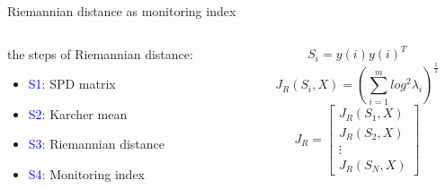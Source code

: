 \documentclass[10pt]{beamer}
\begin{document}
\begin{frame}{Riemannian distance as monitoring index}
   \begin{columns}
        \begin{column}{0.5\textwidth}
            the steps of Riemannian distance:
      \begin{itemize}
      \item \textcolor{blue}{S1}:   SPD matrix
      \item \textcolor{blue}{S2}:  Karcher mean
      \item \textcolor{blue}{S3}:  Riemannian distance
      \item  \textcolor{blue}{S4}:  Monitoring index
 	 \end{itemize}  
        \end{column}
        \begin{column}{0.5\textwidth}  %
               \begin{equation}
              S_i = y(i)y(i)^T
               \end{equation}
                \begin{equation}
                  J_R(S_i,X) =  \left(  \sum_{i=1}^mlog^2\lambda_i  \right)^\frac{1}{2}
                \end{equation}
                 \begin{equation}
                  J_R =  \begin{bmatrix}
                          J_R(S_1,X) \\
                          J_R(S_2,X) \\
                          \vdots     \\
                           J_R(S_N,X)
                         \end{bmatrix}
                         \label{Jr}
                \end{equation}
        \end{column}
    \end{columns}
\end{frame}
\end{document}
